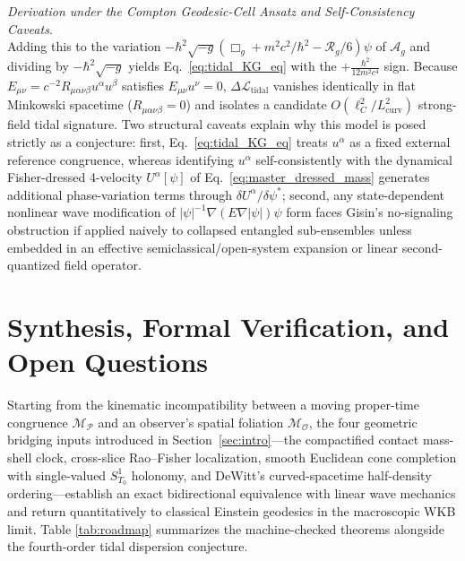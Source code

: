 \documentclass[11pt, a4paper]{article}
\theoremstyle{definition}
\newenvironment{conjecturederivation}[1][Derivation]{\par\medskip\noindent\textit{#1.}\;\ignorespaces}{\par\medskip}
\begin{document}
\begin{conjecturederivation}[Derivation under the Compton Geodesic-Cell Ansatz and Self-Consistency Caveats]
\[\]
Adding this to the variation $-\hbar^2\sqrt{-g}(\Box_g + m^2 c^2/\hbar^2 - \mathcal{R}_g/6)\psi$ of $\mathcal{A}_g$ and dividing by $-\hbar^2\sqrt{-g}$ yields Eq.~\eqref{eq:tidal_KG_eq} with the $+\frac{\hbar^2}{12m^2 c^4}$ sign. Because $E_{\mu\nu} = c^{-2}R_{\mu\alpha\nu\beta}u^\alpha u^\beta$ satisfies $E_{\mu\nu}u^\nu = 0$, $\Delta\mathcal{L}_{\text{tidal}}$ vanishes identically in flat Minkowski spacetime ($R_{\mu\alpha\nu\beta} = 0$) and isolates a candidate $O(\ell_C^2 / L_{\text{curv}}^2)$ strong-field tidal signature. Two structural caveats explain why this model is posed strictly as a conjecture: first, Eq.~\eqref{eq:tidal_KG_eq} treats $u^\alpha$ as a fixed external reference congruence, whereas identifying $u^\alpha$ self-consistently with the dynamical Fisher-dressed 4-velocity $U^\alpha[\psi]$ of Eq.~\eqref{eq:master_dressed_mass} generates additional phase-variation terms through $\delta U^\alpha / \delta\psi^*$; second, any state-dependent nonlinear wave modification of $|\psi|^{-1}\nabla(E\nabla|\psi|)\psi$ form faces Gisin's no-signaling obstruction \cite{Gisin1990} if applied naively to collapsed entangled sub-ensembles unless embedded in an effective semiclassical/open-system expansion or linear second-quantized field operator.
\end{conjecturederivation}

\section{Synthesis, Formal Verification, and Open Questions}
\label{sec:synthesis}

Starting from the kinematic incompatibility between a moving proper-time congruence $\mathcal{M}_{\mathcal{P}}$ and an observer's spatial foliation $\mathcal{M}_{\mathcal{O}}$, the four geometric bridging inputs introduced in Section~\ref{sec:intro}---the compactified contact mass-shell clock, cross-slice Rao--Fisher localization, smooth Euclidean cone completion with single-valued $S^1_{T_0}$ holonomy, and DeWitt's curved-spacetime half-density ordering---establish an exact bidirectional equivalence with linear wave mechanics and return quantitatively to classical Einstein geodesics in the macroscopic WKB limit. Table \ref{tab:roadmap} summarizes the machine-checked theorems alongside the fourth-order tidal dispersion conjecture.
\end{document}
